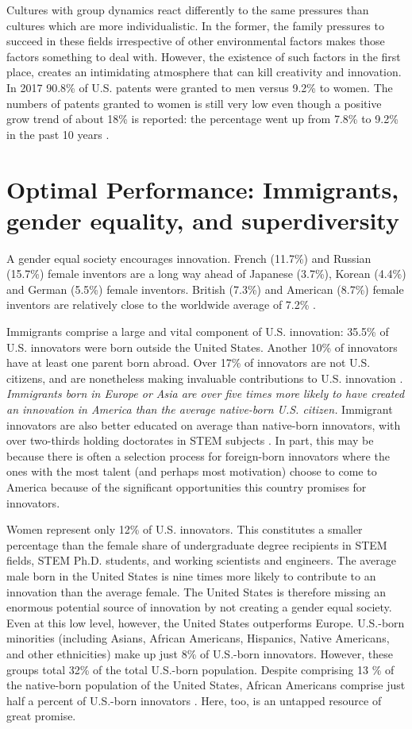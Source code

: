 \documentclass[utf8]{frontiersSCNS} %
\begin{document}
Cultures with group dynamics react differently to the same pressures than cultures which are more individualistic. In the former, the family pressures to succeed in these fields irrespective of other environmental factors makes those factors something to deal with. However, the existence of such factors in the first place, creates an intimidating atmosphere that can kill creativity and innovation.  In 2017 90.8\% of U.S. patents were granted to men versus 9.2\% to women. The numbers of patents granted to women is still very low even though a positive grow trend of about 18\% is reported: the percentage went up from 7.8\% to 9.2\% in the past 10 years \citep{womenPatents}.

\section{Optimal Performance: Immigrants, gender equality, and superdiversity}
\label{Sec5}
A gender equal society encourages innovation. French (11.7\%) and Russian (15.7\%) female inventors are a long way ahead of Japanese (3.7\%), Korean (4.4\%) and German (5.5\%) female inventors. British (7.3\%) and American (8.7\%) female inventors are relatively close to the worldwide average of 7.2\% \citep{nager2016demographics}.

Immigrants comprise a large and vital component of U.S. innovation: 35.5\% of U.S. innovators were born outside the United States. Another 10\% of innovators have at least one parent born abroad. Over 17\% of innovators are not U.S. citizens, and are nonetheless making invaluable contributions to U.S. innovation \citep{nager2016demographics}. {\it Immigrants born in Europe or Asia are over five times more likely to have created an innovation in America than the average native-born U.S. citizen.} Immigrant innovators are also better educated on average than native-born innovators, with over two-thirds holding doctorates in STEM subjects \citep{nager2016demographics}. In part, this may be because there is often a selection process for foreign-born innovators where the ones with the most talent (and perhaps most motivation) choose to come to America because of the significant opportunities this country promises for innovators. 

Women represent only 12\% of U.S. innovators. This constitutes a smaller percentage than the female share of undergraduate degree recipients in STEM fields, STEM Ph.D. students, and working scientists and engineers. The average male born in the United States is nine times more likely to contribute to an innovation than the average female. The United States is therefore missing an enormous potential source of innovation by not creating a gender equal society. Even at this low level, however, the United States outperforms Europe. U.S.-born minorities (including Asians, African Americans, Hispanics, Native Americans, and other ethnicities) make up just 8\% of U.S.-born innovators. However, these groups total 32\% of the total U.S.-born population. Despite comprising 13 \% of the native-born population of the United States, African Americans comprise just half a percent of U.S.-born innovators \citep{nager2016demographics}. Here, too, is an untapped resource of great promise. 
\end{document}

